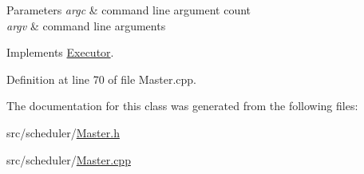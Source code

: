 \begin{DoxyParams}{Parameters}
{\em argc} & command line argument count \\
\hline
{\em argv} & command line arguments \\
\hline
\end{DoxyParams}


Implements \hyperlink{class_executor_aabad4923751a6ea70ca536d4d1f2f32a}{Executor}.



Definition at line 70 of file Master.\+cpp.



The documentation for this class was generated from the following files\+:\begin{DoxyCompactItemize}
\item 
src/scheduler/\hyperlink{_master_8h}{Master.\+h}\item 
src/scheduler/\hyperlink{_master_8cpp}{Master.\+cpp}\end{DoxyCompactItemize}
